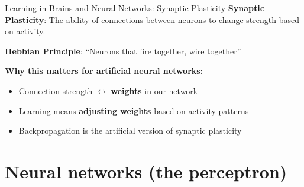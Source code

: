 \documentclass[aspectratio=169]{beamer}\usepackage[]{graphicx}\usepackage[]{xcolor}
\begin{document}
\begin{frame}{Learning in Brains and Neural Networks: Synaptic Plasticity}
\textbf{Synaptic Plasticity}: The ability of connections between neurons to change strength based on activity.
\vfill
\begin{center}
\end{center}
\vfill

\textbf{Hebbian Principle}: ``Neurons that fire together, wire together''

\vfill

\textbf{Why this matters for artificial neural networks:}
\begin{itemize}
    \item Connection strength $\leftrightarrow$ \textbf{weights} in our network
    \item Learning means \textbf{adjusting weights} based on activity patterns
    \item Backpropagation is the artificial version of synaptic plasticity
\end{itemize}
\end{frame}



\section{Neural networks (the perceptron)}
\end{document}
